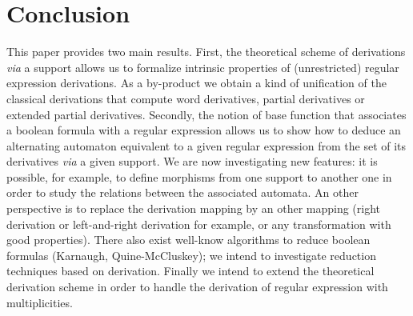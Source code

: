 \documentclass{article}
\begin{document}
    

  
\section{Conclusion}
This paper provides two main results.
First, the theoretical scheme of derivations {\it via} a support 
allows us to formalize intrinsic properties of (unrestricted) regular expression derivations.
As a by-product we obtain a kind of unification of the classical derivations that
compute word derivatives, partial derivatives or extended partial derivatives. 
Secondly, the notion of base function that associates a boolean formula with a regular expression
allows us to show how to deduce an alternating automaton equivalent to a given regular expression
from the set of its derivatives {\it via} a given support.
We are now investigating new features: it is possible, for example,
to define morphisms from one support to another one
in order to study the relations between the associated automata.
An other perspective is to replace the derivation mapping by an other mapping (right derivation
or left-and-right derivation for example, or any transformation with good properties).
There also exist well-know algorithms to reduce boolean formulas (Karnaugh, Quine-McCluskey);
we intend to investigate reduction techniques based on derivation.
Finally we intend to extend the theoretical derivation scheme in order to handle the derivation of regular expression 
with multiplicities.
 

  
    
\end{document}
